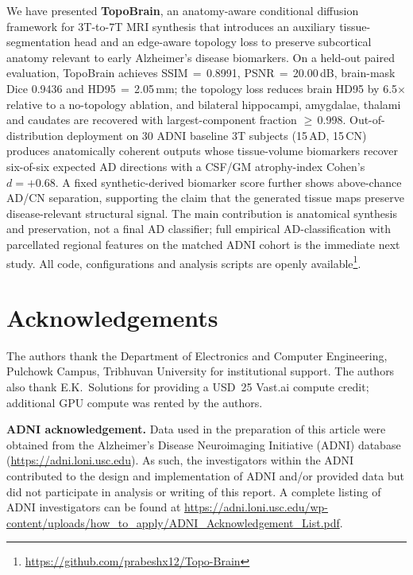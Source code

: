 \documentclass[10pt,twocolumn,a4paper]{article}
\begin{document}
We have presented \textbf{TopoBrain}, an anatomy-aware conditional
diffusion framework for 3T-to-7T MRI synthesis that introduces an
auxiliary tissue-segmentation head and an edge-aware topology loss to
preserve subcortical anatomy relevant to early Alzheimer's disease
biomarkers. On a held-out paired evaluation, TopoBrain achieves
SSIM\,$=$\,0.8991, PSNR\,$=$\,20.00\,dB, brain-mask Dice 0.9436 and
HD95\,$=$\,2.05\,mm; the topology loss reduces brain HD95 by
6.5$\times$ relative to a no-topology ablation, and bilateral
hippocampi, amygdalae, thalami and caudates are recovered with
largest-component fraction $\geq$\,0.998. Out-of-distribution
deployment on 30 ADNI baseline 3T subjects (15\,AD, 15\,CN) produces
anatomically coherent outputs whose tissue-volume biomarkers recover
six-of-six expected AD directions with a CSF/GM atrophy-index Cohen's
$d=+0.68$. A fixed synthetic-derived biomarker score further shows
above-chance AD/CN separation, supporting the claim that the generated
tissue maps preserve disease-relevant structural signal. The main
contribution is anatomical synthesis and preservation, not a final AD
classifier; full empirical AD-classification with parcellated regional
features on the matched ADNI cohort is the immediate next study. All
code, configurations and analysis scripts are openly
available\footnote{\url{https://github.com/prabeshx12/Topo-Brain}}.

\section*{Acknowledgements}

The authors thank the Department of Electronics and Computer
Engineering, Pulchowk Campus, Tribhuvan University for institutional
support. The authors also thank E.K.\ Solutions for providing a
USD~25 Vast.ai compute credit; additional GPU compute was rented by
the authors.

\smallskip
\noindent\textbf{ADNI acknowledgement.} Data used in the preparation
of this article were obtained from the Alzheimer's Disease
Neuroimaging Initiative (ADNI) database
(\url{https://adni.loni.usc.edu}). As such, the investigators within
the ADNI contributed to the design and implementation of ADNI and/or
provided data but did not participate in analysis or writing of this
report. A complete listing of ADNI investigators can be found at
\url{https://adni.loni.usc.edu/wp-content/uploads/how_to_apply/ADNI_Acknowledgement_List.pdf}.
\end{document}

